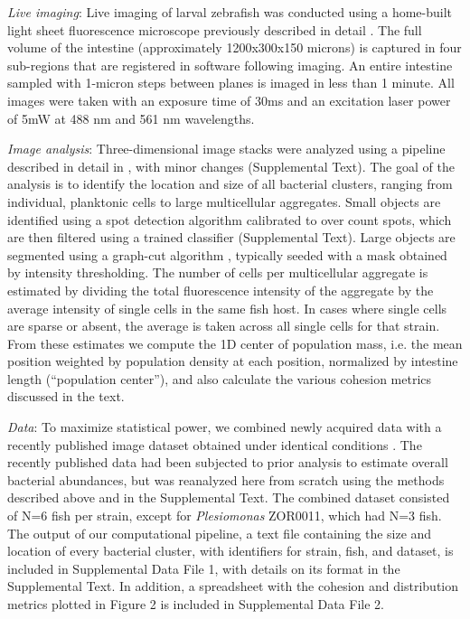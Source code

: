 \textit{Live imaging}: Live imaging of larval zebrafish was conducted using a home-built light sheet fluorescence microscope previously described in detail \cite{jemielita_spatial_2014}. The full volume of the intestine (approximately 1200x300x150 microns) is captured in four sub-regions that are registered in software following imaging. An entire intestine sampled with 1-micron steps between planes is imaged in less than 1 minute. All images were taken with an exposure time of 30ms and an excitation laser power of 5mW at 488 nm and 561 nm wavelengths.

\textit{Image analysis}: Three-dimensional image stacks were analyzed using a pipeline described in detail in \cite{jemielita_spatial_2014}, with minor changes (Supplemental Text).  The goal of the analysis is to identify the location and size of all bacterial clusters, ranging from individual, planktonic cells to large multicellular aggregates.  Small objects are identified using a spot detection algorithm calibrated to over count spots, which are then filtered using a trained classifier (Supplemental Text).  Large objects are segmented using a graph-cut algorithm \cite{boykov_experimental_2004}, typically seeded with a mask obtained by intensity thresholding.  The number of cells per multicellular aggregate is estimated by dividing the total fluorescence intensity of the aggregate by the average intensity of single cells in the same fish host.  In cases where single cells are sparse or absent, the average is taken across all single cells for that strain. From these estimates we compute the 1D center of population mass, i.e. the mean position weighted by population density at each position, normalized by intestine length (``population center''), and also calculate the various cohesion metrics discussed in the text.

\textit{Data}: To maximize statistical power, we combined newly acquired data with a recently published image dataset obtained under identical conditions \cite{wiles_modernized_2018}.  The recently published data had been subjected to prior analysis to estimate overall bacterial abundances, but was reanalyzed here from scratch using the methods described above and in the Supplemental Text.  The combined dataset consisted of N=6 fish per strain, except for \textit{Plesiomonas} ZOR0011, which had N=3 fish.  The output of our computational pipeline, a text file containing the size and location of every bacterial cluster, with identifiers for strain, fish, and dataset, is included in Supplemental Data File 1, with details on its format in the Supplemental Text.  In addition, a spreadsheet with the cohesion and distribution metrics plotted in Figure 2 is included in Supplemental Data File 2. 	




